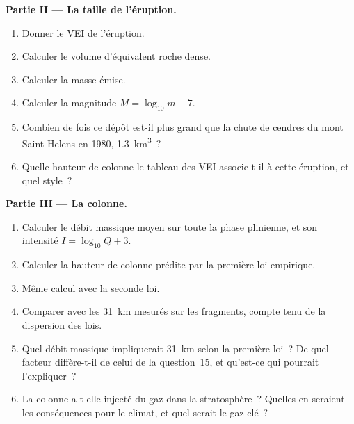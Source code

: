 \begin{problem}
\noindent\textbf{Partie II --- La taille de l'éruption.}
\begin{enumerate}[resume]
\item Donner le VEI de l'éruption.
\item Calculer le volume d'équivalent roche dense.
\item Calculer la masse émise.
\item Calculer la magnitude $M = \log_{10}m - 7$.
\item Combien de fois ce dépôt est-il plus grand que la chute de cendres du mont
Saint-Helens en 1980, \qty{1.3}{km^3}~?
\item Quelle hauteur de colonne le tableau des VEI associe-t-il à cette éruption, et quel
style~?
\end{enumerate}

\noindent\textbf{Partie III --- La colonne.}
\begin{enumerate}[resume]
\item Calculer le débit massique moyen sur toute la phase plinienne, et son
intensité $I = \log_{10}Q + 3$.
\item Calculer la hauteur de colonne prédite par la première loi empirique.
\item Même calcul avec la seconde loi.
\item Comparer avec les \qty{31}{km} mesurés sur les fragments, compte tenu de la dispersion
des lois.
\item Quel débit massique impliquerait \qty{31}{km} selon la première loi~? De quel facteur
diffère-t-il de celui de la question~15, et qu'est-ce qui pourrait l'expliquer~?
\item La colonne a-t-elle injecté du gaz dans la stratosphère~? Quelles en seraient les conséquences
pour le climat, et quel serait le gaz clé~?
\end{enumerate}


\end{problem}
